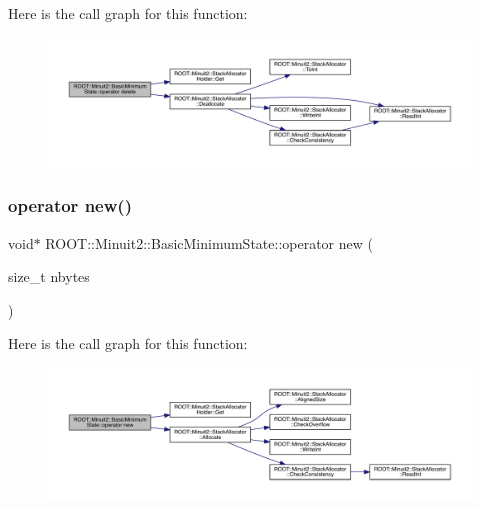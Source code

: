 Here is the call graph for this function\+:
\nopagebreak
\begin{figure}[H]
\begin{center}
\leavevmode
\includegraphics[width=350pt]{d0/db1/classROOT_1_1Minuit2_1_1BasicMinimumState_a19ccca7f7825c16fca3c7ab6f147fdd6_cgraph}
\end{center}
\end{figure}
\mbox{\label{classROOT_1_1Minuit2_1_1BasicMinimumState_ad0e5ab496757c5bee3544485a49fe7aa}} 
\subsubsection{\texorpdfstring{operator new()}{operator new()}\hspace{0.1cm}{\footnotesize\ttfamily [1/2]}}
{\footnotesize\ttfamily void$\ast$ R\+O\+O\+T\+::\+Minuit2\+::\+Basic\+Minimum\+State\+::operator new (\begin{DoxyParamCaption}\item[{size\+\_\+t}]{nbytes }\end{DoxyParamCaption})\hspace{0.3cm}{\ttfamily [inline]}}

Here is the call graph for this function\+:
\nopagebreak
\begin{figure}[H]
\begin{center}
\leavevmode
\includegraphics[width=350pt]{d0/db1/classROOT_1_1Minuit2_1_1BasicMinimumState_ad0e5ab496757c5bee3544485a49fe7aa_cgraph}
\end{center}
\end{figure}
\mbox{\label{classROOT_1_1Minuit2_1_1BasicMinimumState_ad0e5ab496757c5bee3544485a49fe7aa}} 
